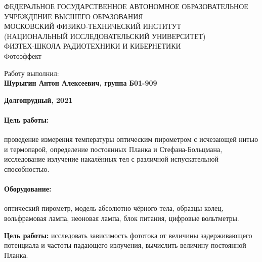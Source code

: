 \documentclass[15pt,a5paper,reqno]{article}
\begin{document}
\begin{center}
  {\small ФЕДЕРАЛЬНОЕ ГОСУДАРСТВЕННОЕ АВТОНОМНОЕ ОБРАЗОВАТЕЛЬНОЕ\\ УЧРЕЖДЕНИЕ ВЫСШЕГО ОБРАЗОВАНИЯ\\ МОСКОВСКИЙ ФИЗИКО-ТЕХНИЧЕСКИЙ ИНСТИТУТ\\ (НАЦИОНАЛЬНЫЙ ИССЛЕДОВАТЕЛЬСКИЙ УНИВЕРСИТЕТ)\\ ФИЗТЕХ-ШКОЛА РАДИОТЕХНИКИ И КИБЕРНЕТИКИ}\\
  \hfill \break
  \hfill \break
  \hfill \break
  \Huge{Фотоэффект}\\
\end{center}

\hfill \break
\hfill \break
\hfill \break
\hfill \break
\hfill \break
\hfill \break

\begin{flushright}
  \normalsize{Работу выполнил:}\\
  \normalsize{\textbf{Шурыгин Антон Алексеевич, группа Б01-909}}\\
\end{flushright}

\begin{center}
  \normalsize{\textbf{Долгопрудный, 2021}}
\end{center}


\thispagestyle{empty} %


\newpage
\thispagestyle{plain}
\tableofcontents
\thispagestyle{plain}
\newpage

\paragraph{Цель работы:} проведение измерения температуры оптическим пирометром с исчезающей нитью и термопарой, определение постоянных Планка и Стефана-Больцмана, исследование излучение накалённых тел с различной испускательной способностью.
\paragraph{Оборудование:} оптический пирометр, модель абсолютно чёрного тела, образцы колец, вольфрамовая лампа, неоновая лампа, блок питания, цифровые вольтметры.


\textbf{Цель работы:} исследовать зависимость фототока от величины задерживающего потенциала и частоты падающего излучения, вычислить величину постоянной Планка.
\end{document}
